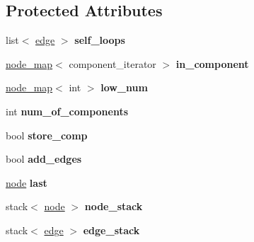 \subsection*{Protected Attributes}
\begin{DoxyCompactItemize}
\item 
\mbox{\label{classbiconnectivity_ab32b1a6264c24c6eec564cf082e980a1}} 
list$<$ \mbox{\hyperlink{classedge}{edge}} $>$ {\bfseries self\+\_\+loops}
\item 
\mbox{\label{classbiconnectivity_a487da69817fa89ab3d1523ad9846ae8e}} 
\mbox{\hyperlink{classnode__map}{node\+\_\+map}}$<$ component\+\_\+iterator $>$ {\bfseries in\+\_\+component}
\item 
\mbox{\label{classbiconnectivity_ac5817e2122477ed591ef229c081745f3}} 
\mbox{\hyperlink{classnode__map}{node\+\_\+map}}$<$ int $>$ {\bfseries low\+\_\+num}
\item 
\mbox{\label{classbiconnectivity_a89fbd540b8a61aad150020be657ddfb7}} 
int {\bfseries num\+\_\+of\+\_\+components}
\item 
\mbox{\label{classbiconnectivity_a989307b07f4a976649bd7551173bd564}} 
bool {\bfseries store\+\_\+comp}
\item 
\mbox{\label{classbiconnectivity_a70c1310b4ba83dbe10594f3a33f94763}} 
bool {\bfseries add\+\_\+edges}
\item 
\mbox{\label{classbiconnectivity_a6f2e474efeb8ccb023d9b84385798193}} 
\mbox{\hyperlink{classnode}{node}} {\bfseries last}
\item 
\mbox{\label{classbiconnectivity_a6b33fabd4da60c573adfb0538f28e0ed}} 
stack$<$ \mbox{\hyperlink{classnode}{node}} $>$ {\bfseries node\+\_\+stack}
\item 
\mbox{\label{classbiconnectivity_aaf715d6044028c456515389e879dd5d8}} 
stack$<$ \mbox{\hyperlink{classedge}{edge}} $>$ {\bfseries edge\+\_\+stack}
\item 
\mbox{\label{classbiconnectivity_a1d484917f1822478d148647cfae05605}} 

\end{DoxyCompactItemize}
